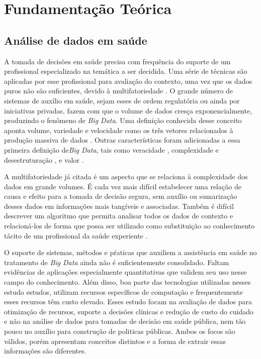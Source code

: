 
\chapter{Fundamentação Teórica}
\label{chap:fundamentacaoTeorica}

\section{Análise de dados em saúde}

A tomada de decisões em saúde precisa com frequência do suporte de um profissional especializado na temática a ser decidida. Uma série de técnicas são aplicadas por esse profissional para avaliação do contexto, uma vez que os dados puros não são suficientes, devido à multifatoriedade \cite{andrade_tomada_2008,resende2009}. O grande número de sistemas de auxílio em saúde, sejam esses de ordem regulatória ou ainda por iniciativas privadas, fazem com que o volume de dados cresça exponencialmente, produzindo o fenômeno de \emph{Big Data}. Uma definição conhecida desse conceito aponta volume, variedade e velocidade como os três vetores relacionados à produção massiva de dados \cite{laney20013d}. Outras características foram adicionadas a essa primeira definição de\emph{Big Data}, tais como veracidade \cite{schroeck2012analytics},  complexidade e desestruturação \cite{intel2012}, e valor \cite{oracle2013}.

A multifatoriedade já citada é um aspecto que se relaciona à complexidade dos dados em grande volumes. É cada vez mais difícil estabelecer uma relação de causa e efeito para a tomada de decisão segura, sem auxílio ou sumarização desses dados em informações mais tangíveis e associadas. Também é difícil descrever um algoritmo que permita analisar todos os dados de contexto e relacioná-los de forma que possa ser utilizado como substituição ao conhecimento tácito de um profissional da saúde experiente \cite{faceli2011}.

O suporte de sistemas, métodos e pŕaticas que auxiliem a assistência em saúde no tratamento de \emph{Big Data}  ainda não é suficientemente consolidado. Faltam evidências de aplicações especialmente quantitativas que validem seu uso nesse campo do conhecimento. Além disso, boa parte das tecnologias utilizadas nesses estudo estudos, utilizam recursos específicos de computação e frequentemente esses recursos têm custo elevado. Esses estudo focam na  avaliação de dados para otimização de recursos, suporte a decisões clínicas e redução de custo do cuidado \cite{nishita2018} e não na análise de dados para tomadas de decisão em saúde pública, nem tão pouco no auxílio para construção de politicas públicas. Ambos os focos são válidos, porém apresentam conceitos distintos e a forma de extrair essas informações são diferentes.

